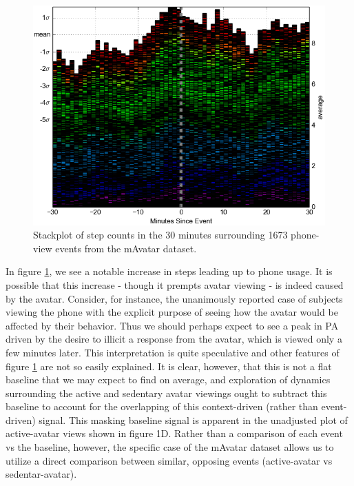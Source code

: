 \begin{figure}
\centering
\includegraphics[width=0.9\columnwidth]{./img/mAvatarViews_1673_wOverlap.png}
\caption{Stackplot of step counts in the 30 minutes surrounding 1673 phone-view events from the mAvatar dataset.}
\label{fig:mAvatarPhoneContext}
\end{figure}

In figure \ref{fig:mAvatarPhoneContext}, we see a notable increase in steps leading up to phone usage.
It is possible that this increase - though it prempts avatar viewing - is indeed caused by the avatar.
Consider, for instance, the unanimously reported case of subjects viewing the phone with the explicit purpose of seeing how the avatar would be affected by their behavior.
Thus we should perhaps expect to see a peak in PA driven by the desire to illicit a response from the avatar, which is viewed only a few minutes later.
This interpretation is quite speculative and other features of figure \ref{fig:mAvatarPhoneContext} are not so easily explained.
It is clear, however, that this is not a flat baseline that we may expect to find on average, and exploration of dynamics surrounding the active and sedentary avatar viewings ought to subtract this baseline to account for the overlapping of this context-driven (rather than event-driven) signal.
This masking baseline signal is apparent in the unadjusted plot of active-avatar views shown in figure 1D. 
Rather than a comparison of each event vs the baseline, however, the specific case of the mAvatar dataset allows us to utilize a direct comparison between similar, opposing events (active-avatar vs sedentar-avatar).


